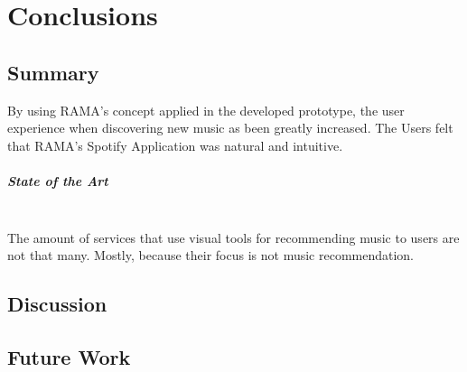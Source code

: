 
\chapter{Conclusions}
\label{chap:chap5}

\section*{}


\section{Summary} %
\label{sec:summary}

  By using RAMA's concept applied in the developed prototype, the user experience when discovering new music as been greatly increased.
  The Users felt that RAMA's Spotify Application was natural and intuitive.


  \paragraph*{State of the Art} \hfill \\
  \indent The amount of services that use visual tools for recommending music to users are not that many.
  Mostly, because their focus is not music recommendation.




\section{Discussion} %
\label{sec:discussion}



\section{Future Work} %
\label{sec:future_work}


